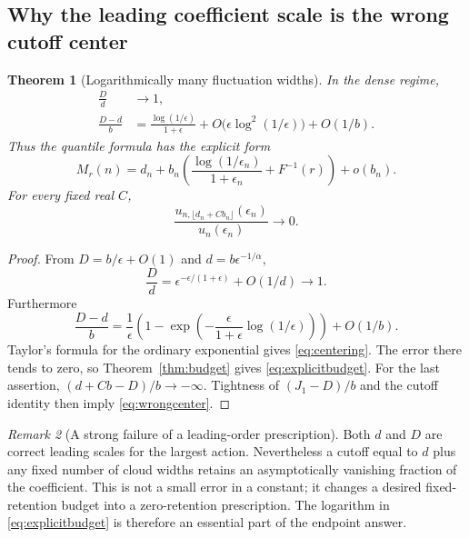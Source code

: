 \documentclass[11pt,a4paper]{article}
\numberwithin{equation}{section}
\newtheorem{theorem}{Theorem}[section]
\theoremstyle{definition}
\theoremstyle{remark}
\newtheorem{remark}[theorem]{Remark}
\newcommand{\ee}{\epsilon}
\begin{document}
\subsection{Why the leading coefficient scale is the wrong cutoff center}
\begin{theorem}[Logarithmically many fluctuation widths]\label{thm:centering}
In the dense regime,
\begin{align}
 \frac{D}{d}&\longrightarrow1,\label{eq:Doverd}\\
 \frac{D-d}{b}
 &=\frac{\log(1/\ee)}{1+\ee}
   +O\bigl(\ee\log^2(1/\ee)\bigr)+O(1/b).\label{eq:centering}
\end{align}
Thus the quantile formula has the explicit form
\begin{equation}\label{eq:explicitbudget}
 \boxed{\displaystyle
 M_r(n)=d_n+b_n\left(
       \frac{\log(1/\ee_n)}{1+\ee_n}+F^{-1}(r)\right)+o(b_n).}
\end{equation}
For every fixed real $C$,
\begin{equation}\label{eq:wrongcenter}
 \frac{u_{n,\lfloor d_n+Cb_n\rfloor}(\ee_n)}{u_n(\ee_n)}
 \longrightarrow0.
\end{equation}
\end{theorem}
\begin{proof}
From $D=b/\ee+O(1)$ and $d=b\ee^{-1/\alpha}$,
\[
 \frac{D}{d}=\ee^{-\ee/(1+\ee)}+O(1/d)\longrightarrow1.
\]
Furthermore
\[
 \frac{D-d}{b}
 =\frac1\ee\left(1-
       \exp\left(-\frac{\ee}{1+\ee}\log(1/\ee)\right)\right)+O(1/b).
\]
Taylor's formula for the ordinary exponential gives \eqref{eq:centering}.
The error there tends to zero, so Theorem~\ref{thm:budget} gives
\eqref{eq:explicitbudget}. For the last assertion,
$(d+Cb-D)/b\to-\infty$. Tightness of $(J_1-D)/b$ and the cutoff identity
then imply \eqref{eq:wrongcenter}.
\end{proof}

\begin{remark}[A strong failure of a leading-order prescription]
Both $d$ and $D$ are correct leading scales for the largest action.
Nevertheless a cutoff equal to $d$ plus any fixed number of cloud widths
retains an asymptotically vanishing fraction of the coefficient. This is
not a small error in a constant; it changes a desired fixed-retention
budget into a zero-retention prescription. The logarithm in
\eqref{eq:explicitbudget} is therefore an essential part of the endpoint
answer.
\end{remark}
\end{document}
